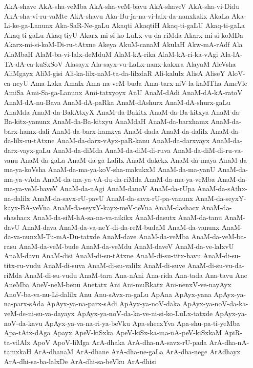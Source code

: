 {AkA-shave
AkA-sha-veMba
AkA-sha-veM-bavu
AkA-shaveV
AkA-sha-vi-Didu
AkA-sha-vi-ru-vaMte
AkA-shavu
Aka-Bu-ja-na-vi-lalx-da-nanxkakx
AkaLa
Aka-Li-ke-ga-Lanunx
Aka-SaR-Ne-gaLu
Akaqti
AkaqtiH
Akaq-ti-gaLU
Akaq-ti-gaLa
Akaq-ti-gaLu
Akaq-tiyU
Akarx-mi-si-ko-LuLx-vu-da-riMda
Akarx-mi-si-koMDa
Akarx-mi-si-koM-Di-ru-tAtxne
Akeya
AkuM-canaM
AkulaH
Akw-mA-rAdf
Ala
AlaMbaH
AlaM-ba-vi-lalx-deMduM
AlaM-kA-rika
AlaM-kA-ri-ka-vAgi
Ala-lA-TA-dA-ca-kuSxSoV
Alasayx
Ala-sayx-vu-LaLx-nanx-kakxra
AlayaM
AleVsha
AliMgayx
AliM-gisi
Ali-ka-lilx-naM-ta-da-lilxdaR
Ali-kalulx
AlisA
AliseY
AloV-ca-neyU
Ama-Laka
Amalx
Ama-na-veM-buda
Ama-tarx-niV-la-kaMTha
AmeVle
AmiSa
Ami-Sa-ga-Lanunx
Ami-tatxyoyx
AnU
AnaM-dAdi
AnaM-dA-kA-ratoV
AnaM-dA-nu-Bava
AnaM-dA-paRka
AnaM-dAshurx
AnaM-dA-shurx-gaLu
AnaMda
AnaM-da-BakAtxyX
AnaM-da-Bakitx
AnaM-da-Ba-kitxya
AnaM-da-Ba-kitx-yanunx
AnaM-da-Ba-kitxyu
AnaMdaH
AnaM-da-barxhamx
AnaM-da-barx-hamx-dali
AnaM-da-barx-hamxva
AnaM-dada
AnaM-da-dalilx
AnaM-da-da-lilx-ru-tAtxne
AnaM-da-darx-vAyx-paR-kanu
AnaM-da-darxvayx
AnaM-da-darx-vayx-gaLu
AnaM-da-diMda
AnaM-da-diM-di-ruva
AnaM-da-diM-di-ru-va-vanu
AnaM-da-gaLa
AnaM-da-ga-Lalilx
AnaM-dakekx
AnaM-da-maya
AnaM-da-ma-ya-koVsha
AnaM-da-ma-ya-koV-sha-makukxM
AnaM-da-ma-yanU
AnaM-da-ma-ya-vAda
AnaM-da-ma-ya-vA-du-da-riMda
AnaM-da-ma-ya-veMba
AnaM-da-ma-ya-veM-baveV
AnaM-da-nAgi
AnaM-danoV
AnaM-da-rUpa
AnaM-da-sAthx-na-dalilx
AnaM-da-savx-rU-pavU
AnaM-da-savx-rU-pa-vanunx
AnaM-da-seyxY-kayx-BA-veVna
AnaM-da-seyxY-kayx-meV-teVna
AnaM-dashacx
AnaM-da-shashacx
AnaM-da-siM-hA-sa-na-va-nikikx
AnaM-dasutx
AnaM-da-tanu
AnaM-davU
AnaM-dava
AnaM-da-va-neY-di-da-reM-budaM
AnaM-da-vanunx
AnaM-da-va-nunxM-Tu-mA-Du-tatxde
AnaM-dave
AnaM-da-veMba
AnaM-da-veM-ba-rasu
AnaM-da-veM-bude
AnaM-da-veMdu
AnaM-daveV
AnaM-da-ve-lalxvU
AnaM-davu
AnaM-disi
AnaM-di-su-tAtxne
AnaM-di-su-titx-havu
AnaM-di-su-titx-ru-vudu
AnaM-di-suva
AnaM-di-su-valilx
AnaM-di-suve
AnaM-di-su-vu-da-riMda
AnaM-di-su-vudu
AnaM-tara
Ana-nAni
Ana-rida
Ana-tada
Ana-tavu
Ane
AneMba
AneV-neM-benu
Anetatx
Ani
Ani-muRkatx
Ani-nenxV-ve-nayAyx
AnoV-ba-va-nu-Li-dalilx
Anu
Anu-sAvx-ra-gaLu
ApAna
ApAyx-yana
ApAyx-ya-na-parx-sAda
ApAyx-ya-na-parx-sAdi
ApAyx-ya-noV-daka
ApAyx-ya-noV-da-ka-veM-de-ni-su-va-dayayx
ApAyx-ya-noV-da-ka-ve-ni-si-ko-LuLx-tatxde
ApAyx-ya-noV-da-kavu
ApAyx-ya-va-na-ri-ya-beVku
Apa-shecxYva
Apa-shu-pa-ti-yeMba
Apa-tAtx-dAga
Apayx
ApeV-kiSxka
ApeV-kiSx-ka-ma-nA-peV-kiSxkaM
ApiR-ta-vilAlx
ApoV
ApoV-liMga
ArA-dhaka
ArA-dha-nA-savx-rU-pada
ArA-dha-nA-tamxkaH
ArA-dhanaM
ArA-dhane
ArA-dha-ne-gaLa
ArA-dha-nege
ArAdhayx
ArA-dhi-sa-ba-lalxDe
ArA-dhi-sa-beVku
ArA-dhisi
}
